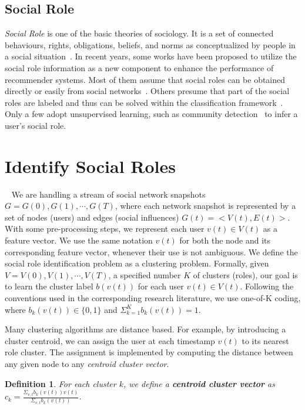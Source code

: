 \documentclass{ieeeaccess}
\newtheorem{myDef}{Definition}
\begin{document}
\subsection{Social Role}
\textit{Social Role} is one of the basic theories of sociology. It is a set of connected behaviours, rights, obligations, beliefs, and norms as conceptualized by people in a social situation~\cite{Biddle1986Recent}. In recent years, some works have been proposed to utilize the social role information as a new component to enhance the performance of recommender systems. Most of them assume that social roles can be obtained directly or easily from social networks~\cite{Zhao2014Social,Wu2015Participatory,Wang2007Role,Huang2016Social}. Others presume that part of the social roles are labeled and thus can be solved within the classification framework~\cite{Zhao2013Inferring}. Only a few adopt unsupervised learning, such as community detection~\cite{Mislove2010You,Henderson2012Rolx} to infer a user's social role.

\section{Identify Social Roles}~\label{sec:role}
We are handling a stream of social network snapshots $G={G(0),G(1),\cdots,G(T)}$, where each network snapshot is represented by a set of nodes (users) and edges (social influences) $G(t)=<V(t),E(t)>$.  With some pre-processing steps, we represent each user $v(t)\in V(t)$ as a feature vector. We use the same notation $v(t)$ for both the node and its corresponding feature vector, whenever their use is not ambiguous. We define the social role identification problem as a clustering problem. Formally, given $V={V(0),V(1),\cdots,V(T)}$, a specified number $K$ of clusters (roles), our goal is to learn the cluster label $b(v(t))$ for each user $v(t)\in V(t)$. Following the conventions used in the corresponding research literature, we use one-of-K coding, where $b_k(v(t))\in \{0,1\}$ and $\Sigma_{k=1}^K b_k(v(t))=1$.


Many clustering algorithms are distance based. For example, by introducing a cluster centroid, we can assign the user at each timestamp $v(t)$ to its nearest role cluster. The assignment is implemented by computing the distance between any given node to any \textit{centroid cluster vector}.

\begin{myDef}
For each cluster $k$, we define a \textbf{centroid cluster vector} as $c_k=\frac{\Sigma_{v,t}b_k(v(t)) v(t)}{\Sigma_{v,t} b_k(v(t))} $.
\end{myDef}
\end{document}
